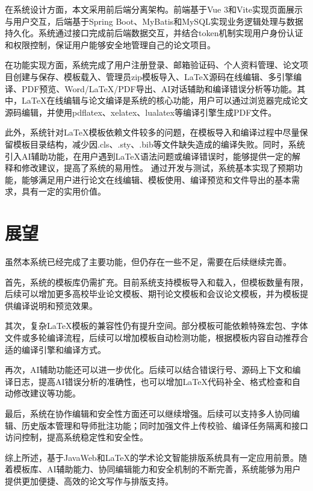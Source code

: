 \documentclass{xduugthesis}
\begin{document}
在系统设计方面，本文采用前后端分离架构。前端基于Vue 3和Vite实现页面展示与用户交互，后端基于Spring Boot、MyBatis和MySQL实现业务逻辑处理与数据持久化。系统通过接口完成前后端数据交互，并结合token机制实现用户身份认证和权限控制，保证用户能够安全地管理自己的论文项目。

在功能实现方面，系统完成了用户注册登录、邮箱验证码、个人资料管理、论文项目创建与保存、模板载入、管理员zip模板导入、LaTeX源码在线编辑、多引擎编译、PDF预览、Word/LaTeX/PDF导出、AI对话辅助和编译错误分析等功能。其中，LaTeX在线编辑与论文编译是系统的核心功能，用户可以通过浏览器完成论文源码编辑，并使用pdflatex、xelatex、lualatex等编译引擎生成PDF文件。

此外，系统针对LaTeX模板依赖文件较多的问题，在模板导入和编译过程中尽量保留模板目录结构，减少因.cls、.sty、.bib等文件缺失造成的编译失败。同时，系统引入AI辅助功能，在用户遇到LaTeX语法问题或编译错误时，能够提供一定的解释和修改建议，提高了系统的易用性。
通过开发与测试，系统基本实现了预期功能，能够满足用户进行论文在线编辑、模板使用、编译预览和文件导出的基本需求，具有一定的实用价值。

\section{展望}
虽然本系统已经完成了主要功能，但仍存在一些不足，需要在后续继续完善。

首先，系统的模板库仍需扩充。目前系统支持模板导入和载入，但模板数量有限，后续可以增加更多高校毕业论文模板、期刊论文模板和会议论文模板，并为模板提供编译说明和预览效果。

其次，复杂LaTeX模板的兼容性仍有提升空间。部分模板可能依赖特殊宏包、字体文件或多轮编译流程，后续可以增加模板自动检测功能，根据模板内容自动推荐合适的编译引擎和编译方式。

再次，AI辅助功能还可以进一步优化。后续可以结合错误行号、源码上下文和编译日志，提高AI错误分析的准确性，也可以增加LaTeX代码补全、格式检查和自动修改建议等功能。

最后，系统在协作编辑和安全性方面还可以继续增强。后续可以支持多人协同编辑、历史版本管理和导师批注功能；同时加强文件上传校验、编译任务隔离和接口访问控制，提高系统稳定性和安全性。

综上所述，基于JavaWeb和LaTeX的学术论文智能排版系统具有一定应用前景。随着模板库、AI辅助能力、协同编辑能力和安全机制的不断完善，系统能够为用户提供更加便捷、高效的论文写作与排版支持。
\end{document}
